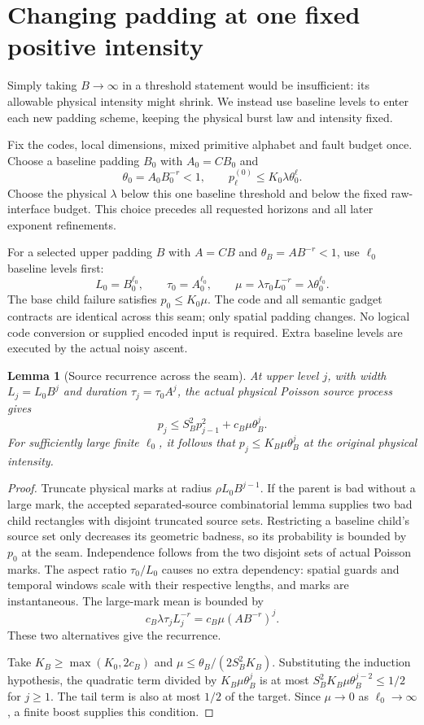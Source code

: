\documentclass[11pt]{article}
\newtheorem{lemma}{Lemma}
\begin{document}
\section{Changing padding at one fixed positive intensity}

Simply taking $B\to\infty$ in a threshold statement would be insufficient:
its allowable physical intensity might shrink. We instead use baseline
levels to enter each new padding scheme, keeping the physical burst law
and intensity fixed.

Fix the codes, local dimensions, mixed primitive alphabet and fault
budget once. Choose a baseline padding $B_0$ with $A_0=CB_0$ and
\[
 \theta_0=A_0B_0^{-r}<1,\qquad
 p^{(0)}_\ell\leq K_0\lambda\theta_0^\ell.
\]
Choose the physical $\lambda$ below this one baseline threshold and
below the fixed raw-interface budget. This choice precedes all requested
horizons and all later exponent refinements.

For a selected upper padding $B$ with
$A=CB$ and $\theta_B=AB^{-r}<1$, use $\ell_0$ baseline levels first:
\[
 L_0=B_0^{\ell_0},\qquad \tau_0=A_0^{\ell_0},\qquad
 \mu=\lambda\tau_0L_0^{-r}=\lambda\theta_0^{\ell_0}.
\]
The base child failure satisfies $p_0\leq K_0\mu$. The code and all
semantic gadget contracts are identical across this seam; only spatial
padding changes. No logical code conversion or supplied encoded input
is required. Extra baseline levels are executed by the actual noisy
ascent.

\begin{lemma}[Source recurrence across the seam]\label{lem:seam}
At upper level $j$, with width $L_j=L_0B^j$ and duration
$\tau_j=\tau_0A^j$, the actual physical Poisson source process gives
\[
 p_j\leq S_B^2p_{j-1}^2+c_B\mu\theta_B^j.
\]
For sufficiently large finite $\ell_0$, it follows that
$p_j\leq K_B\mu\theta_B^j$ at the original physical intensity.
\end{lemma}

\begin{proof}
Truncate physical marks at radius $\rho L_0B^{j-1}$. If the parent is
bad without a large mark, the accepted separated-source combinatorial
lemma supplies two bad child rectangles with disjoint truncated source
sets. Restricting a baseline child's source set only decreases its
geometric badness, so its probability is bounded by $p_0$ at the seam.
Independence follows from the two disjoint sets of actual Poisson marks.
The aspect ratio $\tau_0/L_0$ causes no extra dependency: spatial guards
and temporal windows scale with their respective lengths, and marks
are instantaneous. The large-mark mean is bounded by
\[
 c_B\lambda\tau_jL_j^{-r}
 =c_B\mu(AB^{-r})^j.
\]
These two alternatives give the recurrence.

Take $K_B\geq\max(K_0,2c_B)$ and
$\mu\leq\theta_B/(2S_B^2K_B)$. Substituting the induction hypothesis,
the quadratic term divided by $K_B\mu\theta_B^j$ is at most
$S_B^2K_B\mu\theta_B^{j-2}\leq1/2$ for $j\geq1$.
The tail term is also at most $1/2$ of the target. Since
$\mu\to0$ as $\ell_0\to\infty$, a finite boost supplies this condition.
\end{proof}
\end{document}
